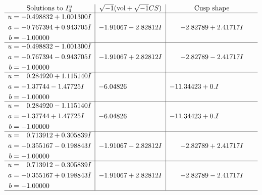 \documentclass[1p]{elsarticle_modified}
\theoremstyle{definition}
\newcommand{\I}{\sqrt{-1}}
\begin{document}
$$\begin{array}{c|c|c}  
\text{Solutions to }I^u_{4}& \I (\text{vol} + \sqrt{-1}CS) & \text{Cusp shape}\\
 \hline 
\begin{aligned}
u &= -0.498832 + 1.001300 I \\
a &= -0.767394 + 0.943705 I \\
b &= -1.00000\phantom{ +0.000000I}\end{aligned}
 & -1.91067 - 2.82812 I & -2.82789 + 2.41717 I \\ \hline\begin{aligned}
u &= -0.498832 - 1.001300 I \\
a &= -0.767394 - 0.943705 I \\
b &= -1.00000\phantom{ +0.000000I}\end{aligned}
 & -1.91067 + 2.82812 I & -2.82789 - 2.41717 I \\ \hline\begin{aligned}
u &= \phantom{-}0.284920 + 1.115140 I \\
a &= -1.37744 - 1.47725 I \\
b &= -1.00000\phantom{ +0.000000I}\end{aligned}
 & -6.04826\phantom{ +0.000000I} & -11.34423 + 0. I\phantom{ +0.000000I} \\ \hline\begin{aligned}
u &= \phantom{-}0.284920 - 1.115140 I \\
a &= -1.37744 + 1.47725 I \\
b &= -1.00000\phantom{ +0.000000I}\end{aligned}
 & -6.04826\phantom{ +0.000000I} & -11.34423 + 0. I\phantom{ +0.000000I} \\ \hline\begin{aligned}
u &= \phantom{-}0.713912 + 0.305839 I \\
a &= -0.355167 - 0.198843 I \\
b &= -1.00000\phantom{ +0.000000I}\end{aligned}
 & -1.91067 - 2.82812 I & -2.82789 + 2.41717 I \\ \hline\begin{aligned}
u &= \phantom{-}0.713912 - 0.305839 I \\
a &= -0.355167 + 0.198843 I \\
b &= -1.00000\phantom{ +0.000000I}\end{aligned}
 & -1.91067 + 2.82812 I & -2.82789 - 2.41717 I\\
 \hline 
 \end{array}$$\newpage\newpage\renewcommand{\arraystretch}{1}
\end{document}
